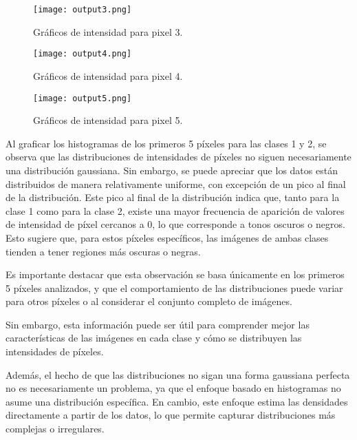\documentclass[spanish]{article}
\begin{document}
\begin{enumerate}
\begin{enumerate}
\begin{enumerate}
\begin{enumerate}
\begin{figure}[h]
\begin{centering}
\texttt{[image: output3.png]}
\par\end{centering}
\caption{Gráficos de intensidad para pixel 3.\label{fig:Graficos de intensidad para pixel 3.}}

\end{figure}

\begin{figure}[h]
\begin{centering}
\texttt{[image: output4.png]}
\par\end{centering}
\caption{Gráficos de intensidad para pixel 4.\label{fig:Graficos de intensidad para pixel 4.}}

\end{figure}

\begin{figure}[h]
\begin{centering}
\texttt{[image: output5.png]}
\par\end{centering}
\caption{Gráficos de intensidad para pixel 5.\label{fig:Graficos de intensidad para pixel 5.}}

\end{figure}

\par Al graficar los histogramas de los primeros 5 píxeles para las clases 1 y 2, se observa que las distribuciones de intensidades de píxeles no siguen necesariamente una distribución gaussiana. Sin embargo, se puede apreciar que los datos están distribuidos de manera relativamente uniforme, con excepción de un pico al final de la distribución.
Este pico al final de la distribución indica que, tanto para la clase 1 como para la clase 2, existe una mayor frecuencia de aparición de valores de intensidad de píxel cercanos a 0, lo que corresponde a tonos oscuros o negros. Esto sugiere que, para estos píxeles específicos, las imágenes de ambas clases tienden a tener regiones más oscuras o negras.
\par Es importante destacar que esta observación se basa únicamente en los primeros 5 píxeles analizados, y que el comportamiento de las distribuciones puede variar para otros píxeles o al considerar el conjunto completo de imágenes. \par Sin embargo, esta información puede ser útil para comprender mejor las características de las imágenes en cada clase y cómo se distribuyen las intensidades de píxeles.
\par Además, el hecho de que las distribuciones no sigan una forma gaussiana perfecta no es necesariamente un problema, ya que el enfoque basado en histogramas no asume una distribución específica. En cambio, este enfoque estima las densidades directamente a partir de los datos, lo que permite capturar distribuciones más complejas o irregulares.


\end{enumerate}
\end{enumerate}
\end{enumerate}
\end{enumerate}
\end{document}
